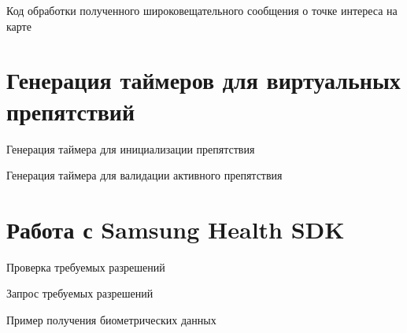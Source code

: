 \begin{ListingEnv}
	\caption{Код обработки полученного широковещательного сообщения о точке интереса на карте}
	\UseRawInputEncoding
	\footnotesize
	
	\label{list:geofence_brr_on_receive}
\end{ListingEnv}

\section{Генерация таймеров для виртуальных препятствий}
\begin{ListingEnv}
	\caption{Генерация таймера для инициализации препятствия}
	\UseRawInputEncoding
	\footnotesize
	
	\label{list:generate_obstacle_start_timer}
\end{ListingEnv}

\begin{ListingEnv}
	\caption{Генерация таймера для валидации активного препятствия}
	\UseRawInputEncoding
	\footnotesize
	
	\label{list:generate_obstacle_finish_timer}
\end{ListingEnv}

\newpage
\section{Работа с Samsung Health SDK}
\label{list_sec:shm}
\begin{ListingEnv}
	\caption{Проверка требуемых разрешений}
	\UseRawInputEncoding
	\footnotesize
	
	\label{list:shm_check_permissions}
\end{ListingEnv}\nobreak
\begin{ListingEnv}
	\caption{Запрос требуемых разрешений}
	\UseRawInputEncoding
	\footnotesize
	
	\label{list:shm_request_permissions}
\end{ListingEnv}
\pagebreak
\begin{ListingEnv}
	\caption{Пример получения биометрических данных}
	\UseRawInputEncoding
	\footnotesize
	
	\label{list:shm_get_data}
\end{ListingEnv}